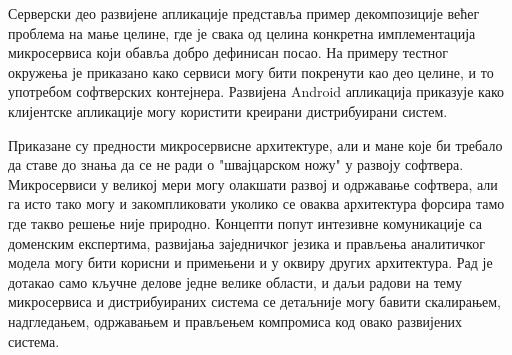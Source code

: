 \documentclass[12pt,oneside]{memoir}
\begin{document}
Серверски део развијене апликације представља пример декомпозиције већег проблема на мање целине, где је свака од целина конкретна имплементација микросервиса који обавља добро дефинисан посао. На примеру тестног окружења је приказано како сервиси могу бити покренути као део целине, и то употребом софтверских контејнера. Развијена Android апликација приказује како клијентске апликације могу користити креирани дистрибуирани систем.

Приказане су предности микросервисне архитектуре, али и мане које би требало да ставе до знања да се не ради о "швајцарском ножу" у развоју софтвера. Микросервиси у великој мери могу олакшати развој и одржавање софтвера, али га исто тако могу и закомпликовати уколико се оваква архитектура форсира тамо где такво решење није природно. Концепти попут интезивне комуникације са доменским експертима, развијања заједничког језика и прављења аналитичког модела могу бити корисни и примењени и у оквиру других архитектура. Рад је дотакао само кључне делове једне велике области, и даљи радови на тему микросервиса и дистрибуираних система се детаљније могу бавити скалирањем, надгледањем, одржавањем и прављењем компромиса код овако развијених система.

\literatura

\end{document}
